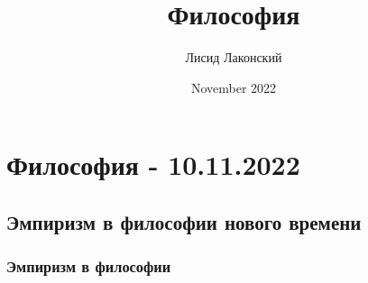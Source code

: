 \documentclass{article}
\title{Философия}
\author{Лисид Лаконский}
\date{November 2022}
\begin{document}
\maketitle
\tableofcontents
\pagebreak

\section{Философия - 10.11.2022}

\subsection{Эмпиризм в философии нового времени}

\subsubsection{Эмпиризм в философии}
\end{document}

